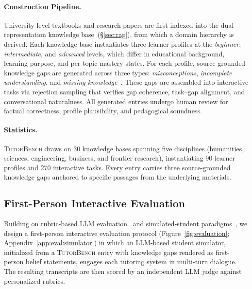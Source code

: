 \paragraph{Construction Pipeline.}
University-level textbooks and research papers are first indexed into the dual-representation knowledge base~(\S\ref{sec:rag}), from which a domain hierarchy is derived.
Each knowledge base instantiates three learner profiles at the \emph{beginner}, \emph{intermediate}, and \emph{advanced} levels, which differ in educational background, learning purpose, and per-topic mastery states.
For each profile, source-grounded knowledge gaps are generated across three types: \emph{misconceptions}, \emph{incomplete understanding}, and \emph{missing knowledge}~\citep{smith1993misconceptions,shute2008focus}.
These gaps are assembled into interactive tasks via rejection sampling that verifies gap coherence, task--gap alignment, and conversational naturalness.
All generated entries undergo human review for factual correctness, profile plausibility, and pedagogical soundness.

\paragraph{Statistics.}
\textsc{TutorBench} draws on 30 knowledge bases spanning five disciplines (humanities, sciences, engineering, business, and frontier research), instantiating 90 learner profiles and 270 interactive tasks.
Every entry carries three source-grounded knowledge gaps anchored to specific passages from the underlying materials.

\subsection{First-Person Interactive Evaluation}
\label{sec:interactive_eval}

Building on rubric-based LLM evaluation~\citep{zheng2023judging,huang2025mathtutorbench} and simulated-student paradigms~\citep{dinucujianu2025pedagogy,scarlatos2026simulatedstudents,pan2025tutorup}, we design a first-person interactive evaluation protocol (Figure~\ref{fig:evaluation}; Appendix~\ref{app:eval:simulator}) in which an LLM-based student simulator, initialized from a \textsc{TutorBench} entry with knowledge gaps rendered as first-person belief statements, engages each tutoring system in multi-turn dialogue.
The resulting transcripts are then scored by an independent LLM judge against personalized rubrics.

